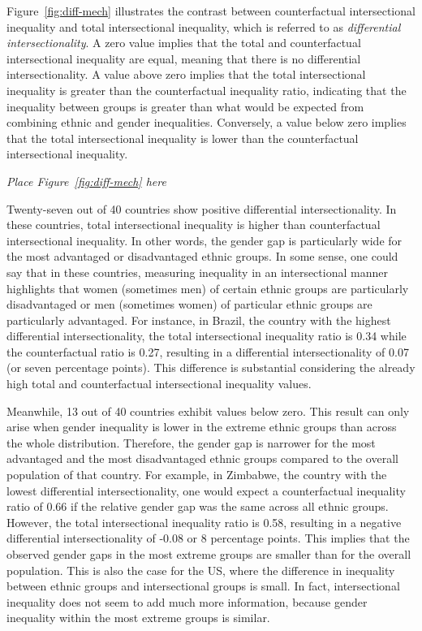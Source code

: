 Figure~\ref{fig:diff-mech} illustrates the contrast between counterfactual intersectional inequality and total intersectional inequality, which is referred to as \emph{differential intersectionality}. A zero value implies that the total and counterfactual intersectional inequality are equal, meaning that there is no differential intersectionality. A value above zero implies that the total intersectional inequality is greater than the counterfactual inequality ratio, indicating that the inequality between groups is greater than what would be expected from combining ethnic and gender inequalities. Conversely, a value below zero implies that the total intersectional inequality is lower than the counterfactual intersectional inequality.

\begin{center}
    \textit{Place Figure~\ref{fig:diff-mech} here}
\end{center}

Twenty-seven out of 40 countries show positive differential intersectionality. In these countries, total intersectional inequality is higher than counterfactual intersectional inequality. In other words, the gender gap is particularly wide for the most advantaged or disadvantaged ethnic groups. In some sense, one could say that in these countries, measuring inequality in an intersectional manner highlights that women (sometimes men) of certain ethnic groups are particularly disadvantaged or men (sometimes women) of particular ethnic groups are particularly advantaged. For instance, in Brazil, the country with the highest differential intersectionality, the total intersectional inequality ratio is 0.34 while the counterfactual ratio is 0.27, resulting in a differential intersectionality of 0.07 (or seven percentage points). This difference is substantial considering the already high total and counterfactual intersectional inequality values.

Meanwhile, 13 out of 40 countries exhibit values below zero. This result can only arise when gender inequality is lower in the extreme ethnic groups than across the whole distribution. Therefore, the gender gap is narrower for the most advantaged and the most disadvantaged ethnic groups compared to the overall population of that country. For example, in Zimbabwe, the country with the lowest differential intersectionality, one would expect a counterfactual inequality ratio of 0.66 if the relative gender gap was the same across all ethnic groups. However, the total intersectional inequality ratio is 0.58, resulting in a negative differential intersectionality of -0.08 or 8 percentage points. This implies that the observed gender gaps in the most extreme groups are smaller than for the overall population. This is also the case for the US, where the difference in inequality between ethnic groups and intersectional groups is small. In fact, intersectional inequality does not seem to add much more information, because gender inequality within the most extreme groups is similar. 


